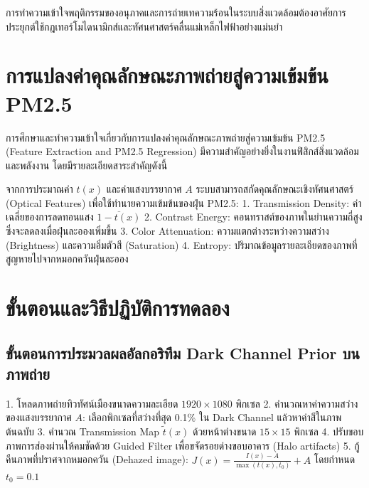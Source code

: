 \begin{physbox}
การทำความเข้าใจพฤติกรรมของอนุภาคและการถ่ายเทความร้อนในระบบสิ่งแวดล้อมต้องอาศัยการประยุกต์ใช้กฎเทอร์โมไดนามิกส์และทัศนศาสตร์คลื่นแม่เหล็กไฟฟ้าอย่างแม่นยำ
\end{physbox}

\section{การแปลงค่าคุณลักษณะภาพถ่ายสู่ความเข้มข้น PM2.5}

การศึกษาและทำความเข้าใจเกี่ยวกับการแปลงค่าคุณลักษณะภาพถ่ายสู่ความเข้มข้น PM2.5 (Feature Extraction and PM2.5 Regression) มีความสำคัญอย่างยิ่งในงานฟิสิกส์สิ่งแวดล้อมและพลังงาน โดยมีรายละเอียดสาระสำคัญดังนี้

จากการประมาณค่า $t(x)$ และค่าแสงบรรยากาศ $A$ ระบบสามารถสกัดคุณลักษณะเชิงทัศนศาสตร์ (Optical Features) เพื่อใช้ทำนายความเข้มข้นของฝุ่น PM2.5:
1. Transmission Density: ค่าเฉลี่ยของการลดทอนแสง $\overline{1 - t(x)}$
2. Contrast Energy: คอนทราสต์ของภาพในย่านความถี่สูง ซึ่งจะลดลงเมื่อฝุ่นละอองเพิ่มขึ้น
3. Color Attenuation: ความแตกต่างระหว่างความสว่าง (Brightness) และความอิ่มตัวสี (Saturation)
4. Entropy: ปริมาณข้อมูลรายละเอียดของภาพที่สูญหายไปจากหมอกควันฝุ่นละออง

\section{ขั้นตอนและวิธีปฏิบัติการทดลอง}

\subsection{ขั้นตอนการประมวลผลอัลกอริทึม Dark Channel Prior บนภาพถ่าย}
\begin{conceptbox}
1. โหลดภาพถ่ายทิวทัศน์เมืองขนาดความละเอียด $1920 \times 1080$ พิกเซล
2. คำนวณหาค่าความสว่างของแสงบรรยากาศ $A$: เลือกพิกเซลที่สว่างที่สุด 0.1\% ใน Dark Channel แล้วหาค่าสีในภาพต้นฉบับ
3. คำนวณ Transmission Map $\tilde{t}(x)$ ด้วยหน้าต่างขนาด $15 \times 15$ พิกเซล
4. ปรับขอบภาพการส่องผ่านให้คมชัดด้วย Guided Filter เพื่อขจัดรอยด่างขอบอาคาร (Halo artifacts)
5. กู้คืนภาพที่ปราศจากหมอกควัน (Dehazed image): $J(x) = \frac{I(x) - A}{\max(t(x), t_0)} + A$ โดยกำหนด $t_0 = 0.1$
\end{conceptbox}

